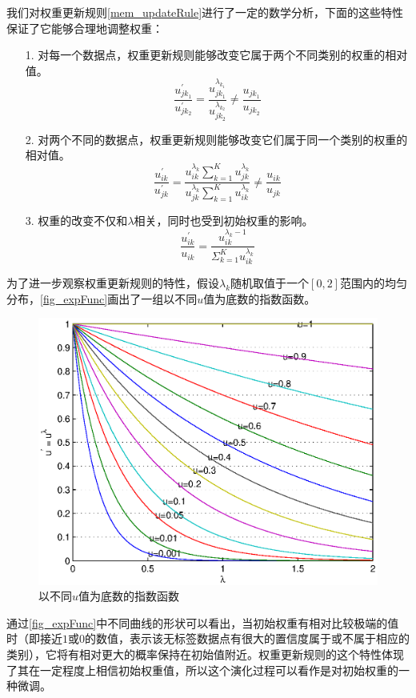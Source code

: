 我们对权重更新规则\autoref{mem_updateRule}进行了一定的数学分析，下面的这些特性保证了它能够合理地调整权重：
\begin{enumerate}
\item[1.]对每一个数据点，权重更新规则能够改变它属于两个不同类别的权重的相对值。
\\ \[ \frac{u_{jk_{1}}^{'}}{u_{jk_{2}}^{'}}=\frac{u_{jk_{1}}^{\lambda_{k_{1}}}}{u_{jk_{2}}^{\lambda_{k_{2}}}} \neq \frac{u_{jk_{1}}}{u_{jk_{2}}} \]
%
\item[2.]对两个不同的数据点，权重更新规则能够改变它们属于同一个类别的权重的相对值。
\\ \[ \frac{u_{ik}^{'}}{u_{jk}^{'}}=\frac{u_{ik}^{\lambda_{k}} \sum_{k=1}^{K}u_{jk}^{\lambda_{k}}}{u_{jk}^{\lambda_{k}} \sum_{k=1}^{K}u_{ik}^{\lambda_{k}}} \neq \frac{u_{ik}}{u_{jk}} \]
%
\item[3.]权重的改变不仅和\(\lambda\)相关，同时也受到初始权重的影响。
\\ \[ \frac{u_{ik}^{'}}{u_{ik}}=\frac{u_{ik}^{\lambda_{k}-1}}{\Sigma_{k=1}^{K} u_{ik}^{\lambda_{k}}} \]
\end{enumerate}
为了进一步观察权重更新规则的特性，假设\(\lambda_{k}\)随机取值于一个\([0,2]\)范围内的均匀分布，\autoref{fig_expFunc}画出了一组以不同\(u\)值为底数的指数函数。
\begin{figure}[h]
   \centering
   \includegraphics[width=4.5in]{figures/expfunc}
\caption{以不同\(u\)值为底数的指数函数}
\label{fig_expFunc}
\end{figure}
%
通过\autoref{fig_expFunc}中不同曲线的形状可以看出，当初始权重有相对比较极端的值时（即接近\(1\)或\(0\)的数值，表示该无标签数据点有很大的置信度属于或不属于相应的类别），它将有相对更大的概率保持在初始值附近。权重更新规则的这个特性体现了其在一定程度上相信初始权重值，所以这个演化过程可以看作是对初始权重的一种微调。

